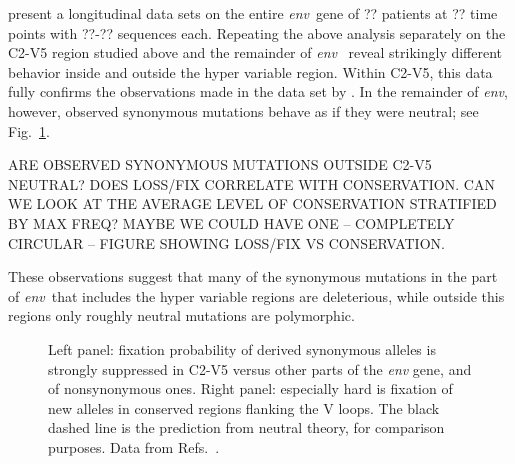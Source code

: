 \documentclass[rmp, twocolumn]{revtex4}
\newcommand{\env}{\textit{env}}
\newcommand{\FIG}[1]{Fig.~\ref{fig:#1}}
\begin{document}
\citet{bunnik_autologous_2008} present a longitudinal data sets on the entire \env~gene of ?? patients at ?? time points with ??-?? sequences each. Repeating the above analysis separately on the C2-V5 region studied above and the remainder of \env~ reveal strikingly different behavior inside and outside the hyper variable region. Within C2-V5, this data fully confirms the observations made in the data set by \citet{shankarappa_consistent_1999}. In the remainder of \env, however, observed synonymous mutations behave as if they were neutral; see \FIG{fixp}. 

ARE OBSERVED SYNONYMOUS MUTATIONS OUTSIDE C2-V5 NEUTRAL? DOES LOSS/FIX CORRELATE WITH CONSERVATION. CAN WE LOOK AT THE AVERAGE LEVEL OF CONSERVATION STRATIFIED BY MAX FREQ? MAYBE WE COULD HAVE ONE -- COMPLETELY CIRCULAR -- FIGURE SHOWING LOSS/FIX VS CONSERVATION.

These observations suggest that many of the synonymous mutations in the part of \env~that includes the hyper variable regions are deleterious, while outside this regions only roughly neutral mutations are polymorphic.



\begin{figure}
\begin{center}
\caption{Left panel: fixation probability of derived synonymous alleles is strongly
suppressed in C2-V5 versus other parts of the {\it env} gene, and of
nonsynonymous ones.
Right panel: especially hard is fixation of new alleles in conserved regions flanking the V
loops. The black dashed line is the prediction from neutral
theory, for comparison purposes. Data from
Refs.~\cite{shankarappa_consistent_1999, bunnik_autologous_2008}.}
\label{fig:fixp}
\end{center}
\end{figure}
\end{document}

